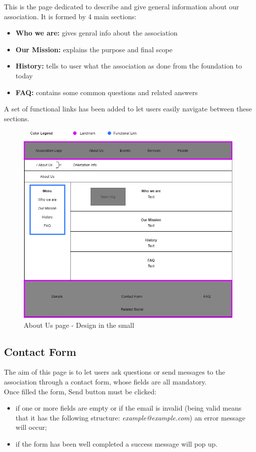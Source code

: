 This is the page dedicated to describe and give general information about our association. It is formed by 4 main sections: 
\begin{itemize}
	\item \textbf{Who we are: } gives genral info about the association
	\item \textbf{Our Mission: } explains the purpose and final scope
	\item \textbf{History: } tells to user what the association as done from the foundation to today
	\item \textbf{FAQ: } contains some common questions and related answers
\end{itemize}
A set of functional links has been added to let users easily navigate between these sections.

\begin{figure}[h!]
	\centering
	\begin{minipage}[b]{1\textwidth}
    		\includegraphics[width=\textwidth]{./assets/aboutus.png}
		\caption{About Us page - Design in the small}
	\end{minipage}
\end{figure}
\FloatBarrier
\clearpage


\subsection{Contact Form}
The aim of this page is to let users ask questions or send messages to the association through a contact form, whose fields are all mandatory. \\
Once filled the form, Send button must be clicked:
\begin{itemize}
	\item if one or more fields are empty or if the email is invalid (being valid means that it has the following structure: 				\emph{example@example.com}) an error message will occur;
	\item if the form has been well completed a success message will pop up.
\end{itemize}


